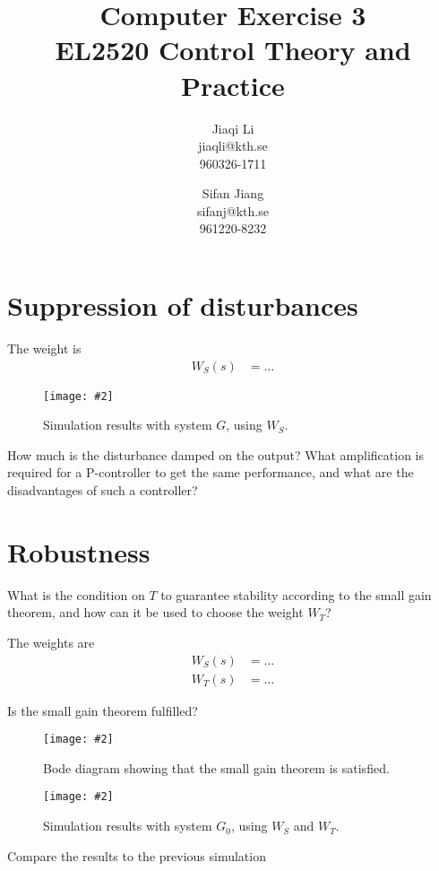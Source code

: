 \documentclass[a4paper,11pt]{article}
\title{
	Computer Exercise 3\\
	EL2520 Control Theory and Practice
}
\author{
	Jiaqi Li\\
	jiaqli@kth.se\\
	960326-1711
	\and
	Sifan Jiang\\
	sifanj@kth.se\\
	961220-8232
}
\newcommand{\image}[3][width=1.0\columnwidth]{
	\begin{figure}[h!]
		\centering
	    \texttt{[image: \#2]}
		\caption{#3}
		\label{fig:#2}
	\end{figure}
}
\begin{document}
	\maketitle

	\section*{Suppression of disturbances}

	The weight is
	\begin{align*}
		W_S(s) &= \ldots
	\end{align*}

	\image{figure_1.pdf}{Simulation results with system $G$, using $W_S$.}

	How much is the disturbance damped on the output?
	What amplification is required for a P-controller to get the same performance, and what are the disadvantages of such a controller?
	\par\dotfill\par\dotfill\par

	\section*{Robustness}
	What is the condition on $T$ to guarantee stability according to the small gain theorem, and how can it be used to choose the weight $W_T$?
	\par\dotfill\par\dotfill\par

	The weights are
	\begin{align*}
		W_S(s) &= \ldots\\
		W_T(s) &= \ldots
	\end{align*}

	Is the small gain theorem fulfilled?
	\par\dotfill\par\dotfill\par

	\image{figure_2.pdf}{Bode diagram showing that the small gain theorem is satisfied.}

	\image{figure_3.pdf}{Simulation results with system $G_0$, using $W_S$ and $W_T$.}

	Compare the results to the previous simulation
	\par\dotfill\par\dotfill\par
\end{document}
